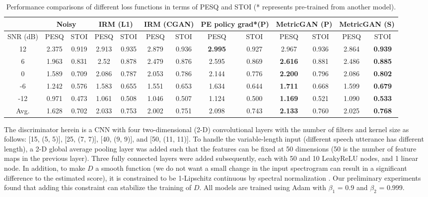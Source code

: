 \documentclass{article}
\begin{document}
\begin{table*}[!t]
\caption{Performance comparisons of different loss functions in terms of PESQ and STOI (* represents pre-trained from another model). }
\vskip -0.1in
\label{tab:different Loss Results}
\begin{center}
\begin{small}
\begin{tabular}{c||c|c||c|c||c|c||c|c||c|c||c|c}
\toprule
&\multicolumn{2}{c||}{\textbf{Noisy}} & \multicolumn{2}{c||}{\textbf{IRM (L1)}} & \multicolumn{2}{c||}{\textbf{IRM (CGAN)}} & \multicolumn{2}{c||}{\textbf{PE policy grad*(P)}} & \multicolumn{2}{c||}{\textbf{MetricGAN (P)}} & \multicolumn{2}{c}{\textbf{MetricGAN (S)}}\\
\hline
SNR (dB) & PESQ & STOI & PESQ & STOI & PESQ & STOI & PESQ & STOI & PESQ & STOI & PESQ & STOI \\
\hline
12	&2.375	&0.919	&2.913	&0.935	&2.879	&0.936	&\textbf{2.995}
&0.927 &2.967	&0.936	&2.864	&\textbf{0.939}
\\

6	&1.963	&0.831	&2.52	&0.878	&2.479	&0.876	&2.595
&0.869 &\textbf{2.616}	&0.881	&2.486	&\textbf{0.885} \\

0	&1.589	&0.709	&2.086	&0.787	&2.053	&0.786	&2.144
&0.776 &\textbf{2.200}	&0.796	&2.086	&\textbf{0.802} \\

-6	&1.242	&0.576	&1.583	&0.655	&1.551	&0.653	&1.634
&0.644 &\textbf{1.711}	&0.668	&1.599	&\textbf{0.679}\\

-12	&0.971	&0.473	&1.061	&0.508	&1.046	&0.507	&1.124
&0.500 &\textbf{1.169}	&0.521	&1.090	&\textbf{0.533}
\\
\hline
Avg.	&1.628	&0.702	&2.033	&0.753	&2.002	&0.751	&2.098
&0.743 &\textbf{2.133}	&0.760	&2.025	&\textbf{0.768}\\
\bottomrule
\end{tabular}
\end{small}
\end{center}
\vskip -0.1in
\end{table*}


The discriminator herein is a CNN with four two-dimensional (2-D) convolutional layers with the number of filters and kernel size as follows: [15, (5, 5)], [25, (7, 7)], [40, (9, 9)], and [50, (11, 11)]. To handle the variable-length input (different speech utterance has different length), a 2-D global average pooling layer was added such that the features can be fixed at 50 dimensions (50 is the number of feature maps in the previous layer). Three fully connected layers were added subsequently, each with 50 and 10 LeakyReLU nodes, and 1 linear node. In addition, to make $D$ a smooth function (we do not want a small change in the input spectrogram can result in a significant difference to the estimated score), it is constrained to be 1-Lipschitz continuous by spectral normalization \cite{miyato2018spectral}.  Our preliminary experiments found that adding this constraint can stabilize the training of $D$. All models are trained using Adam \cite{kingma2014adam} with ${\beta_1}$ = 0.9  and ${\beta_2}$ = 0.999.
\end{document}
